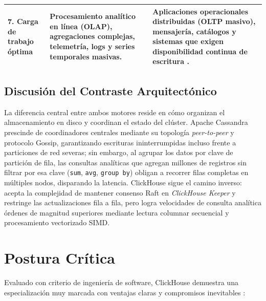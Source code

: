 \documentclass[12pt,a4paper]{article}
\begin{document}
\begin{table}[htbp]
\begin{tabular}{>{\raggedright\arraybackslash}p{3.0cm} >{\raggedright\arraybackslash}p{5.8cm} >{\raggedright\arraybackslash}p{5.8cm}}
\midrule
\textbf{7. Carga de trabajo óptima} & Procesamiento analítico en línea (OLAP), agregaciones complejas, telemetría, logs y series temporales masivas. & Aplicaciones operacionales distribuidas (OLTP masivo), mensajería, catálogos y sistemas que exigen disponibilidad continua de escritura \cite{newman2021building}. \\
\bottomrule
\end{tabular}
\end{table}

\subsection{Discusión del Contraste Arquitectónico}
La diferencia central entre ambos motores reside en cómo organizan el almacenamiento en disco y coordinan el estado del clúster. Apache Cassandra prescinde de coordinadores centrales mediante su topología \textit{peer-to-peer} y protocolo Gossip, garantizando escrituras ininterrumpidas incluso frente a particiones de red severas; sin embargo, al agrupar los datos por clave de partición de fila, las consultas analíticas que agregan millones de registros sin filtrar por esa clave (\texttt{sum}, \texttt{avg}, \texttt{group by}) obligan a recorrer filas completas en múltiples nodos, disparando la latencia. ClickHouse sigue el camino inverso: acepta la complejidad de mantener consenso Raft en \textit{ClickHouse Keeper} \cite{han2024palf} y restringe las actualizaciones fila a fila, pero logra velocidades de consulta analítica órdenes de magnitud superiores mediante lectura columnar secuencial y procesamiento vectorizado SIMD.
\FloatBarrier

\section{Postura Crítica}
Evaluado con criterio de ingeniería de software, ClickHouse demuestra una especialización muy marcada con ventajas claras y compromisos inevitables \cite{habib2024architecture}:
\end{document}
